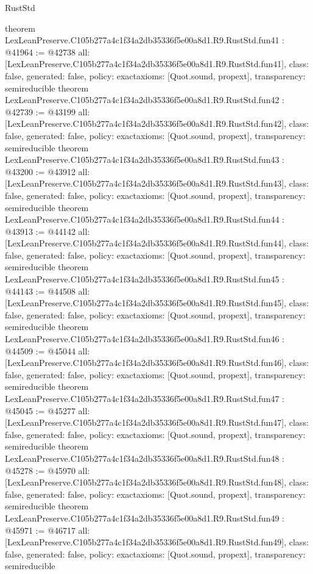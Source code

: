 \begin{lexlean}{RustStd}
\begin{coremodule}
{}
theorem LexLeanPreserve.C105b277a4c1f34a2db35336f5e00a8d1.R9.RustStd.fun41 : @41964 := @42738 {
  all: [LexLeanPreserve.C105b277a4c1f34a2db35336f5e00a8d1.R9.RustStd.fun41],
  class: false,
  generated: false,
  policy: exact{axioms: [Quot.sound, propext]},
  transparency: semireducible
}
theorem LexLeanPreserve.C105b277a4c1f34a2db35336f5e00a8d1.R9.RustStd.fun42 : @42739 := @43199 {
  all: [LexLeanPreserve.C105b277a4c1f34a2db35336f5e00a8d1.R9.RustStd.fun42],
  class: false,
  generated: false,
  policy: exact{axioms: [Quot.sound, propext]},
  transparency: semireducible
}
theorem LexLeanPreserve.C105b277a4c1f34a2db35336f5e00a8d1.R9.RustStd.fun43 : @43200 := @43912 {
  all: [LexLeanPreserve.C105b277a4c1f34a2db35336f5e00a8d1.R9.RustStd.fun43],
  class: false,
  generated: false,
  policy: exact{axioms: [Quot.sound, propext]},
  transparency: semireducible
}
theorem LexLeanPreserve.C105b277a4c1f34a2db35336f5e00a8d1.R9.RustStd.fun44 : @43913 := @44142 {
  all: [LexLeanPreserve.C105b277a4c1f34a2db35336f5e00a8d1.R9.RustStd.fun44],
  class: false,
  generated: false,
  policy: exact{axioms: [Quot.sound, propext]},
  transparency: semireducible
}
theorem LexLeanPreserve.C105b277a4c1f34a2db35336f5e00a8d1.R9.RustStd.fun45 : @44143 := @44508 {
  all: [LexLeanPreserve.C105b277a4c1f34a2db35336f5e00a8d1.R9.RustStd.fun45],
  class: false,
  generated: false,
  policy: exact{axioms: [Quot.sound, propext]},
  transparency: semireducible
}
theorem LexLeanPreserve.C105b277a4c1f34a2db35336f5e00a8d1.R9.RustStd.fun46 : @44509 := @45044 {
  all: [LexLeanPreserve.C105b277a4c1f34a2db35336f5e00a8d1.R9.RustStd.fun46],
  class: false,
  generated: false,
  policy: exact{axioms: [Quot.sound, propext]},
  transparency: semireducible
}
theorem LexLeanPreserve.C105b277a4c1f34a2db35336f5e00a8d1.R9.RustStd.fun47 : @45045 := @45277 {
  all: [LexLeanPreserve.C105b277a4c1f34a2db35336f5e00a8d1.R9.RustStd.fun47],
  class: false,
  generated: false,
  policy: exact{axioms: [Quot.sound, propext]},
  transparency: semireducible
}
theorem LexLeanPreserve.C105b277a4c1f34a2db35336f5e00a8d1.R9.RustStd.fun48 : @45278 := @45970 {
  all: [LexLeanPreserve.C105b277a4c1f34a2db35336f5e00a8d1.R9.RustStd.fun48],
  class: false,
  generated: false,
  policy: exact{axioms: [Quot.sound, propext]},
  transparency: semireducible
}
theorem LexLeanPreserve.C105b277a4c1f34a2db35336f5e00a8d1.R9.RustStd.fun49 : @45971 := @46717 {
  all: [LexLeanPreserve.C105b277a4c1f34a2db35336f5e00a8d1.R9.RustStd.fun49],
  class: false,
  generated: false,
  policy: exact{axioms: [Quot.sound, propext]},
  transparency: semireducible
}
\end{coremodule}
\end{lexlean}
